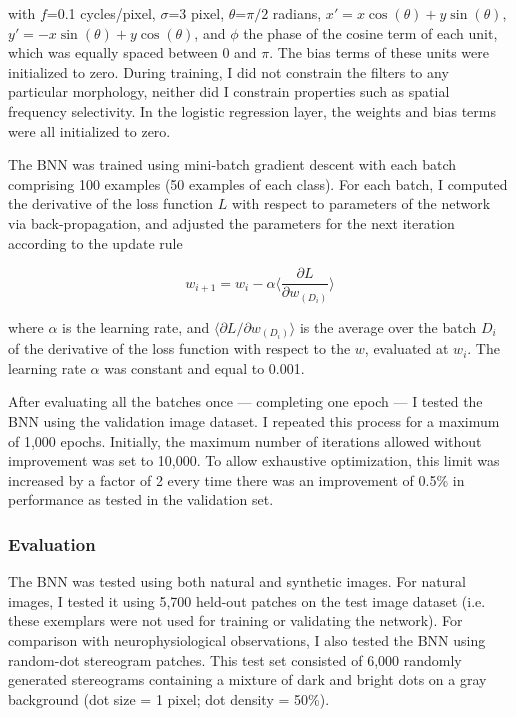 with $f$=0.1 cycles/pixel, $\sigma$=3 pixel, $\theta$=$\pi/2$ radians, $x'=x \cos (\theta)+y \sin (\theta)$, $y'=-x \sin (\theta) + y \cos (\theta)$, and $\phi$  the phase of the cosine term of each unit, which was equally spaced between $0$ and $\pi$. The bias terms of these units were initialized to zero. During training, I did not constrain the filters to any particular morphology, neither did I constrain properties such as spatial frequency selectivity. In the logistic regression layer, the weights and bias terms were all initialized to zero. 

The BNN was trained using mini-batch gradient descent with each batch comprising 100 examples (50 examples of each class). For each batch, I computed the derivative of the loss function $L$ with respect to parameters of the network via back-propagation, and adjusted the parameters for the next iteration according to the update rule

\begin{equation}
  w_{i+1}=w_i - \alpha \Bigg \langle \frac{\partial L}{\partial w_{(D_i)}} \Bigg \rangle
\end{equation}

where $\alpha$ is the learning rate, and $ \big \langle \partial L/ \partial w_{(D_i)}\big \rangle$ is the average over the batch $D_i$ of the derivative of the loss function with respect to the $w$, evaluated at $w_i$. The learning rate $\alpha$ was constant and equal to 0.001. 

After evaluating all the batches once --- completing one epoch --- I tested the BNN using the validation image dataset. I repeated this process for a maximum of 1,000 epochs. Initially, the maximum number of iterations allowed without improvement was set to 10,000. To allow exhaustive optimization, this limit was increased by a factor of 2 every time there was an improvement of 0.5\% in performance as tested in the validation set.

\subsubsection*{Evaluation}

The BNN was tested using both natural and synthetic images. For natural images, I tested it using 5,700 held-out patches on the test image dataset (i.e. these exemplars were not used for training or validating the network). For comparison with neurophysiological observations, I also tested the BNN using random-dot stereogram patches. This test set consisted of 6,000 randomly generated stereograms containing a mixture of dark and bright dots on a gray background (dot size = 1 pixel; dot density = 50\%). 

